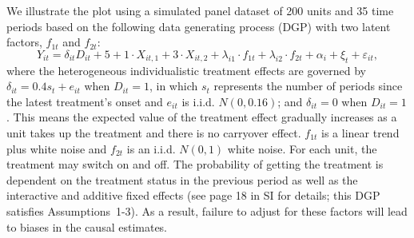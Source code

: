 \documentclass[12pt]{article}
\begin{document}
We illustrate the plot using a simulated panel dataset of 200 units and 35 time periods based on the following data generating process (DGP) with two latent factors, $f_{1t}$ and $f_{2t}$:
\[
Y_{it} = \delta_{it} D_{it} + 5 + 1 \cdot X_{it,1} + 3 \cdot X_{it,2} + \lambda_{i1}\cdot f_{1t} + \lambda_{i2}\cdot f_{2t}+ \alpha_{i} + \xi_{t} + \varepsilon_{it},
\]
where the heterogeneous individualistic treatment effects are governed by $\delta_{it}= 0.4 s_{t} + e_{it}$ when $D_{it} = 1$, in which $s_{t}$ represents the number of periods since the latest treatment's onset  and $e_{it}$ is i.i.d. $N(0,0.16)$; and $\delta_{it}= 0$ when $D_{it} = 1$. This means the expected value of the treatment effect gradually increases as a unit takes up the treatment and there is no carryover effect. $f_{1t}$ is a linear trend plus white noise and $f_{2t}$ is an i.i.d. $N(0,1)$ white noise. For each unit, the treatment may switch on and off. The probability of getting the treatment is dependent on the treatment status in the previous period as well as the interactive and additive fixed effects (see page 18 in SI for details; this DGP satisfies Assumptions~1-3). As a result, failure to adjust for these factors will lead to biases in the causal estimates. 
\end{document}
